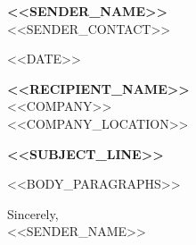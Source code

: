 \documentclass[11pt,a4paper]{article}
\begin{document}
\textbf{<<SENDER_NAME>>}\\
<<SENDER_CONTACT>>

\vspace{1.5em}

<<DATE>>

\vspace{1.5em}

\textbf{<<RECIPIENT_NAME>>}\\
<<COMPANY>>\\
<<COMPANY_LOCATION>>

\vspace{1.5em}

\textbf{<<SUBJECT_LINE>>}

\vspace{1em}

<<BODY_PARAGRAPHS>>

\vspace{1.5em}

Sincerely,\\
<<SENDER_NAME>>
\end{document}
